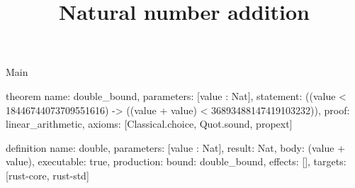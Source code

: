 \begin{lexlean}{Main}
\title{Natural number addition}
\begin{semanticmodule}
theorem{
  name: double_bound,
  parameters: [value : Nat],
  statement: ((value < 18446744073709551616) -> ((value + value) < 36893488147419103232)),
  proof: linear_arithmetic{},
  axioms: [Classical.choice, Quot.sound, propext]
}

definition{
  name: double,
  parameters: [value : Nat],
  result: Nat,
  body: (value + value),
  executable: true,
  production: {bound: double_bound, effects: [], targets: [rust-core, rust-std]}
}
\end{semanticmodule}
\end{lexlean}
